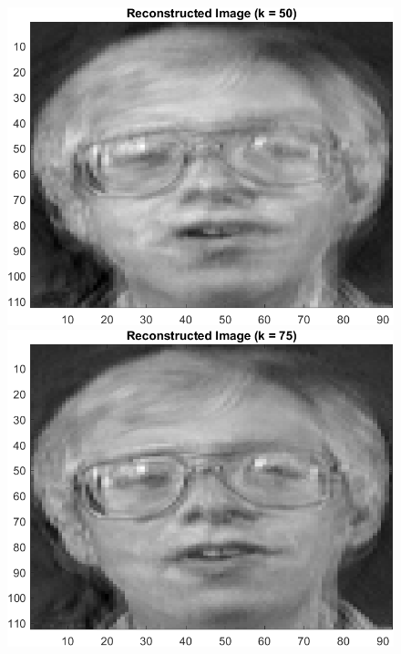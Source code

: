 \documentclass{article}
\begin{document}
\begin{figure}[!htb]
    \centering
    \begin{minipage}[b]{0.3\textwidth}
        \includegraphics[width=\textwidth]{orl_recon_50.png}
    \end{minipage}
    \begin{minipage}[b]{0.3\textwidth}
        \includegraphics[width=\textwidth]{orl_recon_75.png}
    \end{minipage}

\end{figure}
\end{document}
